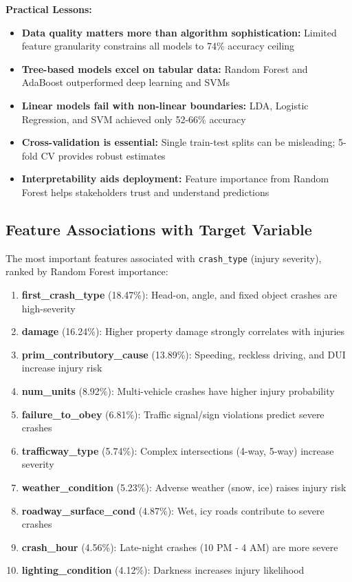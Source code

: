 \documentclass[12pt,man]{apa7}
\begin{document}
\textbf{Practical Lessons:}
\begin{itemize}
    \item \textbf{Data quality matters more than algorithm sophistication:} Limited feature granularity constrains all models to 74\% accuracy ceiling
    \item \textbf{Tree-based models excel on tabular data:} Random Forest and AdaBoost outperformed deep learning and SVMs
    \item \textbf{Linear models fail with non-linear boundaries:} LDA, Logistic Regression, and SVM achieved only 52-66\% accuracy
    \item \textbf{Cross-validation is essential:} Single train-test splits can be misleading; 5-fold CV provides robust estimates
    \item \textbf{Interpretability aids deployment:} Feature importance from Random Forest helps stakeholders trust and understand predictions
\end{itemize}

\subsection{Feature Associations with Target Variable}

The most important features associated with \texttt{crash\_type} (injury severity), ranked by Random Forest importance:

\begin{enumerate}
    \item \textbf{first\_crash\_type} (18.47\%): Head-on, angle, and fixed object crashes are high-severity
    \item \textbf{damage} (16.24\%): Higher property damage strongly correlates with injuries
    \item \textbf{prim\_contributory\_cause} (13.89\%): Speeding, reckless driving, and DUI increase injury risk
    \item \textbf{num\_units} (8.92\%): Multi-vehicle crashes have higher injury probability
    \item \textbf{failure\_to\_obey} (6.81\%): Traffic signal/sign violations predict severe crashes
    \item \textbf{trafficway\_type} (5.74\%): Complex intersections (4-way, 5-way) increase severity
    \item \textbf{weather\_condition} (5.23\%): Adverse weather (snow, ice) raises injury risk
    \item \textbf{roadway\_surface\_cond} (4.87\%): Wet, icy roads contribute to severe crashes
    \item \textbf{crash\_hour} (4.56\%): Late-night crashes (10 PM - 4 AM) are more severe
    \item \textbf{lighting\_condition} (4.12\%): Darkness increases injury likelihood
\end{enumerate}
\end{document}
